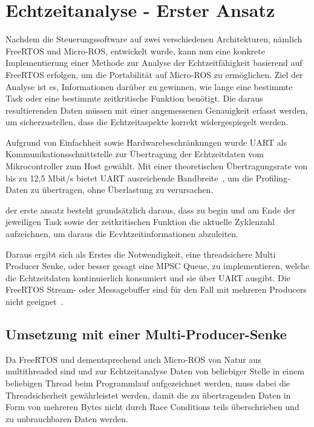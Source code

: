 \section{Echtzeitanalyse - Erster Ansatz}

Nachdem die Steuerungssoftware auf zwei verschiedenen Architekturen, nämlich
FreeRTOS und Micro-ROS, entwickelt wurde, kann nun eine konkrete
Implementierung einer Methode zur Analyse der Echtzeitfähigkeit basierend auf
FreeRTOS erfolgen, um die Portabilität auf Micro-ROS zu ermöglichen. Ziel der
Analyse ist es, Informationen darüber zu gewinnen, wie lange eine bestimmte Task
oder eine bestimmte zeitkritische Funktion benötigt. Die daraus resultierenden
Daten müssen mit einer angemessenen Genauigkeit erfasst werden, um
sicherzustellen, dass die Echtzeitaspekte korrekt widergespiegelt werden.

Aufgrund von Einfachheit sowie Hardwarebeschränkungen wurde UART als
Kommunikationsschnittstelle zur Übertragung der Echtzeitdaten vom
Mikrocontroller zum Host gewählt. Mit einer theoretischen Übertragungsrate von
bis zu 12,5 Mbit/s bietet UART ausreichende Bandbreite~\cite[S.
2]{stm32_datasheet}, um die Profiling-Daten zu übertragen, ohne Überlastung zu
verursachen.

der erste ansatz besteht grundsätzlich daraus, dass zu begin und am Ende der
jeweiligen Task sowie der zeitkritischen Funktion die aktuelle Zyklenzahl
aufzeichnen, um daraus die Ecvhtzeitinformationen abzuleiten.

Daraus ergibt sich als Erstes die Notwendigkeit, eine threadsichere Multi
Producer Senke, oder besser gesagt eine \ac{MPSC} Queue, zu implementieren,
welche die Echtzeitdaten kontinuierlich konsumiert und sie über UART ausgibt.
Die FreeRTOS Stream- oder Messagebuffer sind für den Fall mit mehreren Producers
nicht geeignet~\cite{FreeRTOSStreamBuffer}.

\subsection{Umsetzung mit einer Multi-Producer-Senke}

Da FreeRTOS und dementsprechend auch Micro-ROS von Natur aus multithreaded sind
und zur Echtzeitanalyse Daten von beliebiger Stelle in einem beliebigen Thread
beim Programmlauf aufgezeichnet werden, muss dabei die Threadsicherheit
gewährleistet werden, damit die zu übertragenden Daten in Form von mehreren
Bytes nicht durch Race Conditions teils überschrieben und zu unbrauchbaren Daten
werden.

